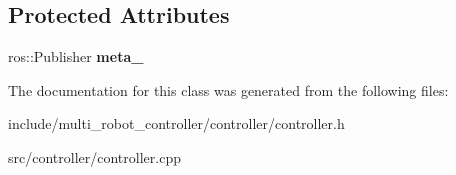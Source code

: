 \subsection*{Protected Attributes}
\begin{DoxyCompactItemize}
\item 
\mbox{\label{classController_aeb648bc7d97b36f1dcba956fa5aaeec6}} 
ros\+::\+Publisher {\bfseries meta\+\_\+}
\end{DoxyCompactItemize}


The documentation for this class was generated from the following files\+:\begin{DoxyCompactItemize}
\item 
include/multi\+\_\+robot\+\_\+controller/controller/controller.\+h\item 
src/controller/controller.\+cpp\end{DoxyCompactItemize}
